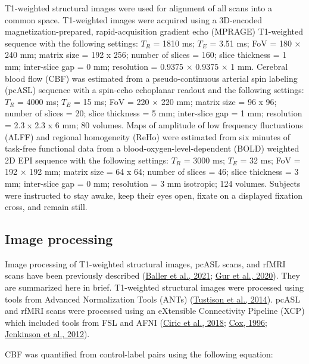 \documentclass[
  12pt,
]{article}
\begin{document}
T1-weighted structural images were used for alignment of all scans into a common space. T1-weighted images were acquired using a 3D-encoded magnetization-prepared, rapid-acquisition gradient echo (MPRAGE) T1-weighted sequence with the following settings: \(T_R\) = 1810 ms; \(T_E\) = 3.51 ms; FoV = 180 × 240 mm; matrix size = 192 x 256; number of slices = 160; slice thickness = 1 mm; inter-slice gap = 0 mm; resolution = 0.9375 × 0.9375 × 1 mm. Cerebral blood flow (CBF) was estimated from a pseudo-continuous arterial spin labeling (pcASL) sequence with a spin-echo echoplanar readout and the following settings: \(T_R\) = 4000 ms; \(T_E\) = 15 ms; FoV = 220 × 220 mm; matrix size = 96 x 96; number of slices = 20; slice thickness = 5 mm; inter-slice gap = 1 mm; resolution = 2.3 x 2.3 x 6 mm; 80 volumes. Maps of amplitude of low frequency fluctuations (ALFF) and regional homogeneity (ReHo) were estimated from six minutes of task-free functional data from a blood-oxygen-level-dependent (BOLD) weighted 2D EPI sequence with the following settings: \(T_R\) = 3000 ms; \(T_E\) = 32 ms; FoV = 192 × 192 mm; matrix size = 64 x 64; number of slices = 46; slice thickness = 3 mm; inter-slice gap = 0 mm; resolution = 3 mm isotropic; 124 volumes. Subjects were instructed to stay awake, keep their eyes open, fixate on a displayed fixation cross, and remain still.

\hypertarget{image-processing}{%
\subsection{Image processing}\label{image-processing}}

Image processing of T1-weighted structural images, pcASL scans, and rfMRI scans have been previously described (\protect\hyperlink{ref-ballerDevelopmentalCouplingCerebral2021}{Baller et al., 2021}; \protect\hyperlink{ref-gurStructuralFunctionalBrain2020}{Gur et al., 2020}). They are summarized here in brief. T1-weighted structural images were processed using tools from Advanced Normalization Tools (ANTs) (\protect\hyperlink{ref-tustisonLargescaleEvaluationANTs2014}{Tustison et al., 2014}). pcASL and rfMRI scans were processed using an eXtensible Connectivity Pipeline (XCP) which included tools from FSL and AFNI (\protect\hyperlink{ref-ciricMitigatingHeadMotion2018}{Ciric et al., 2018}; \protect\hyperlink{ref-cox1996afni}{Cox, 1996}; \protect\hyperlink{ref-jenkinson2012fsl}{Jenkinson et al., 2012}).

CBF was quantified from control-label pairs using the following equation:
\end{document}
